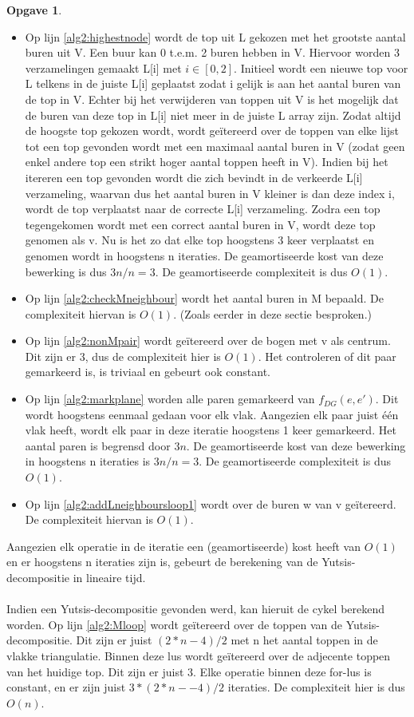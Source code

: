 \documentclass[11pt, a4paper, table]{article}
\theoremstyle{definition}
\newtheorem{opgave}{Opgave}
\theoremstyle{definition}
\theoremstyle{definition}
\begin{document}
\begin{opgave}
\begin{itemize}
	\item Op lijn \ref{alg2:highestnode} wordt de top uit L gekozen met het grootste aantal buren uit V. Een buur kan 0 t.e.m. 2 buren hebben in V. Hiervoor worden 3 verzamelingen gemaakt L[i] met $i \in [0,2]$. Initieel wordt een nieuwe top voor L telkens in de juiste L[i] geplaatst zodat i gelijk is aan het aantal buren van de top in V. Echter bij het verwijderen van toppen uit V is het mogelijk dat de buren van deze top in L[i] niet meer in de juiste L array zijn. Zodat altijd de hoogste top gekozen wordt, wordt ge\"{i}tereerd over de toppen van elke lijst tot een top gevonden wordt met een maximaal aantal buren in V (zodat geen enkel andere top een strikt hoger aantal toppen heeft in V). Indien bij het itereren een top gevonden wordt die zich bevindt in de verkeerde L[i] verzameling, waarvan dus het aantal buren in V kleiner is dan deze index i, wordt de top verplaatst naar de correcte L[i] verzameling. Zodra een top tegengekomen wordt met een correct aantal buren in V, wordt deze top genomen als v. Nu is het zo dat elke top hoogstens 3 keer verplaatst en genomen wordt in hoogstens n iteraties. De geamortiseerde kost van deze bewerking is dus $3n/n = 3$. De geamortiseerde complexiteit is dus $O(1)$. 
	\item Op lijn \ref{alg2:checkMneighbour} wordt het aantal buren in M bepaald. De complexiteit hiervan is $O(1)$. (Zoals eerder in deze sectie besproken.)
	\item Op lijn \ref{alg2:nonMpair} wordt ge\"{i}tereerd over de bogen met v als centrum. Dit zijn er 3, dus de complexiteit hier is $O(1)$. Het controleren of dit paar gemarkeerd is, is triviaal en gebeurt ook constant. 
	\item Op lijn \ref{alg2:markplane} worden alle paren gemarkeerd van $f_{DG}(e,e')$. Dit wordt hoogstens eenmaal gedaan voor elk vlak. Aangezien elk paar juist \'{e}\'{e}n vlak heeft, wordt elk paar in deze iteratie hoogstens 1 keer gemarkeerd. Het aantal paren is begrensd door $3n$. De geamortiseerde kost van deze bewerking in hoogstens n iteraties is $3n/n = 3$. De geamortiseerde complexiteit is dus $O(1)$. 
	\item Op lijn \ref{alg2:addLneighboursloop1} wordt over de buren w van v ge\"{i}tereerd. De complexiteit hiervan is $O(1)$. 
\end{itemize}
Aangezien elk operatie in de iteratie een (geamortiseerde) kost heeft van $O(1)$ en er hoogstens n iteraties zijn is, gebeurt de berekening van de Yutsis-decompositie in lineaire tijd. 
\\\\Indien een Yutsis-decompositie gevonden werd, kan hieruit de cykel berekend worden. Op lijn \ref{alg2:Mloop} wordt ge\"{i}tereerd over de toppen van de Yutsis-decompositie. Dit zijn er juist $(2*n-4)/2$ met n het aantal toppen in de vlakke triangulatie. Binnen deze lus wordt ge\"{i}tereerd over de adjecente toppen van het huidige top. Dit zijn er juist 3. Elke operatie binnen deze for-lus is constant, en er zijn juist $3*(2*n--4)/2$ iteraties. De complexiteit hier is dus $O(n)$. 

\end{opgave}
\end{document}
